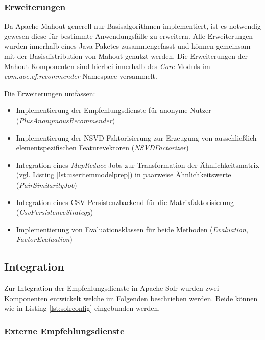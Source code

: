 \subsubsection{Erweiterungen}

Da Apache Mahout generell nur Basisalgorithmen implementiert, ist es notwendig gewesen diese für bestimmte Anwendungsfälle zu erweitern. Alle Erweiterungen wurden innerhalb eines Java-Paketes  zusammengefasst und können gemeinsam mit der Basisdistribution von Mahout genutzt werden. Die Erweiterungen der Mahout-Komponenten sind hierbei innerhalb des \textit{Core} Moduls im \textit{com.aoe.cf.recommender} Namespace versammelt.

Die Erweiterungen umfassen:
\begin{itemize}
\item Implementierung der Empfehlungsdienste für anonyme Nutzer (\textit{PlusAnonymousRecommender})
\item Implementierung der NSVD-Faktorisierung zur Erzeugung von ausschließlich elementspezifischen Featurevektoren (\textit{NSVDFactorizer})
\item Integration eines \textit{MapReduce}-Jobs zur Transformation der Ähnlichkeitsmatrix (vgl. Listing \ref{lst:useritemmodelprep}) in paarweise Ähnlichkeitswerte (\textit{PairSimilarityJob})
\item Integration eines CSV-Persistenzbackend für die Matrixfaktorisierung (\textit{CsvPersistenceStrategy})
\item Implementierung von Evaluationsklassen für beide Methoden (\textit{Evaluation}, \textit{FactorEvaluation})
\end{itemize}

\subsection{Integration}

Zur Integration der Empfehlungsdienste in Apache Solr wurden zwei Komponenten entwickelt welche im Folgenden beschrieben werden. Beide können wie in Listing \ref{lst:solrconfig} eingebunden werden.

\subsubsection{Externe Empfehlungsdienste}

